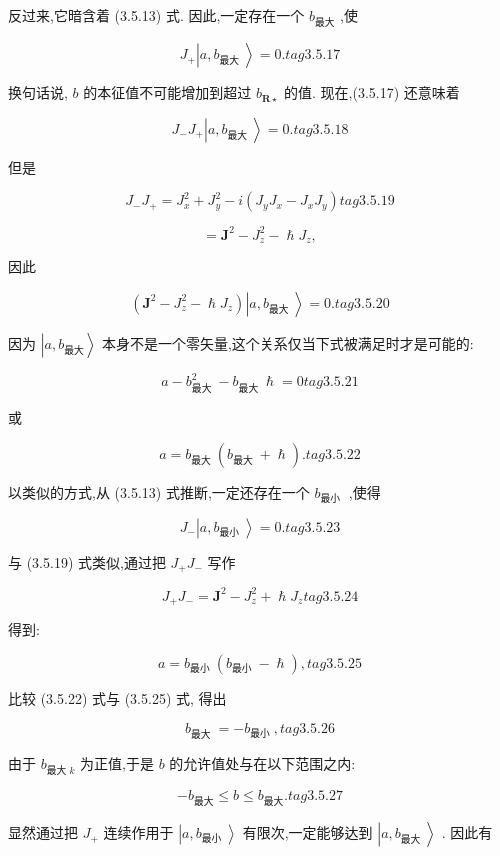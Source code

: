 反过来,它暗含着 (3.5.13) 式. 因此,一定存在一个 ${b}_{最大}$ ,使

$$
{J}_{ + }\left| {a,{b}_{\text{最大 }}}\right\rangle = 0. tag{3.5.17}
$$

换句话说, $b$ 的本征值不可能增加到超过 ${b}_{\mathbf{R} \star }$ 的值. 现在,(3.5.17) 还意味着

$$
{J}_{ - }{J}_{ + }\left| {a,{b}_{\text{最大 }}}\right\rangle = 0. tag{3. 5.18}
$$

但是

$$
{J}_{ - }{J}_{ + } = {J}_{x}^{2} + {J}_{y}^{2} - i\left( {{J}_{y}{J}_{x} - {J}_{x}{J}_{y}}\right) tag{3.5.19}
$$

$$
= {\mathbf{J}}^{2} - {J}_{z}^{2} - \hslash {J}_{z},
$$

因此

$$
\left( {{\mathbf{J}}^{2} - {J}_{z}^{2} - \hslash {J}_{z}}\right) \left| {a,{b}_{\text{最大 }}}\right\rangle = 0. tag{3. 5.20}
$$

因为 $\left| {a,{b}_{最大}}\right\rangle$ 本身不是一个零矢量,这个关系仅当下式被满足时才是可能的:

$$
a - {b}_{\text{最大 }}^{2} - {b}_{\text{最大 }}\hslash = 0 tag{3. 5.21}
$$

或

$$
a = {b}_{\text{最大 }}\left( {{b}_{\text{最大 }} + \hslash }\right) . tag{3. 5.22}
$$

以类似的方式,从 (3.5.13) 式推断,一定还存在一个 ${b}_{\text{最小 }}$ ,使得

$$
{J}_{ - }\left| {a,{b}_{\text{最小 }}}\right\rangle = 0. tag{3. 5.23}
$$

与 (3.5.19) 式类似,通过把 ${J}_{ + }{J}_{ - }$ 写作

$$
{J}_{ + }{J}_{ - } = {\mathbf{J}}^{2} - {J}_{z}^{2} + \hslash {J}_{z} tag{3. 5.24}
$$

得到:

$$
a = {b}_{\text{最小 }}\left( {{b}_{\text{最小 }} - \hslash }\right) , tag{3. 5.25}
$$

比较 (3.5.22) 式与 (3.5.25) 式, 得出

$$
{b}_{\text{最大 }} = - {b}_{\text{最小 }}, tag{3.5.26}
$$

由于 ${b}_{\text{最大 }k}$ 为正值,于是 $b$ 的允许值处与在以下范围之内:

$$
- {b}_{最大} \leq b \leq {b}_{最大}. tag{3. 5.27}
$$

显然通过把 ${J}_{ + }$ 连续作用于 $\left| {a,{b}_{\text{最小 }}}\right\rangle$ 有限次,一定能够达到 $\left| {a,{b}_{\text{最大 }}}\right\rangle$ . 因此有

